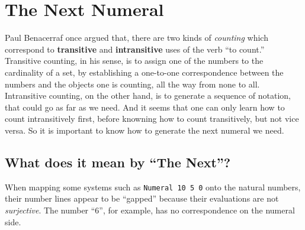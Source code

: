 \documentclass[\main/thesis.tex]{subfiles}
\begin{document}
\section{The Next Numeral}\label{next}

Paul Benacerraf once argued\cite{benacerraf1965numbers} that, there are two kinds
of \textit{counting} which correspond to \textbf{transitive} and \textbf{intransitive}
uses of the verb ``to count.'' Transitive counting, in his sense, is to assign one
of the numbers to the cardinality of a set, by establishing a one-to-one correspondence
between the numbers and the objects one is counting, all the way from none to
all. Intransitive counting, on the other hand, is to generate a sequence of
notation, that could go as far as we need. And it seems that one can only learn
how to count intransitively first, before knowning how to count transitively,
but not vice versa. So it is important to know how to generate the next numeral
we need.

\subsection{What does it mean by ``The Next''?}

When mapping some systems such as {\lstinline|Numeral 10 5 0|} onto
the natural numbers, their number lines appear to be ``gapped'' because their
evaluations are not \textit{surjective}.
The number ``6'', for example, has no correspondence on the numeral side.

\begin{center}
    \begin{adjustbox}{max width=\textwidth}
    \end{adjustbox}
\end{center}
\end{document}
